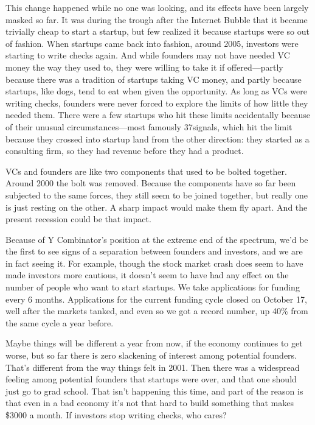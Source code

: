 This change happened while no one was looking, and its effects have been
largely masked so far. It was during the trough after the Internet
Bubble that it became trivially cheap to start a startup, but few
realized it because startups were so out of fashion. When startups came
back into fashion, around 2005, investors were starting to write checks
again. And while founders may not have needed VC money the way they used
to, they were willing to take it if offered---partly because there was a
tradition of startups taking VC money, and partly because startups, like
dogs, tend to eat when given the opportunity. As long as VCs were
writing checks, founders were never forced to explore the limits of how
little they needed them. There were a few startups who hit these limits
accidentally because of their unusual circumstances---most famously
37signals, which hit the limit because they crossed into startup land
from the other direction: they started as a consulting firm, so they had
revenue before they had a product.

VCs and founders are like two components that used to be bolted
together. Around 2000 the bolt was removed. Because the components have
so far been subjected to the same forces, they still seem to be joined
together, but really one is just resting on the other. A sharp impact
would make them fly apart. And the present recession could be that
impact.

Because of Y Combinator's position at the extreme end of the spectrum,
we'd be the first to see signs of a separation between founders and
investors, and we are in fact seeing it. For example, though the stock
market crash does seem to have made investors more cautious, it doesn't
seem to have had any effect on the number of people who want to start
startups. We take applications for funding every 6 months. Applications
for the current funding cycle closed on October 17, well after the
markets tanked, and even so we got a record number, up 40\% from the
same cycle a year before.

Maybe things will be different a year from now, if the economy continues
to get worse, but so far there is zero slackening of interest among
potential founders. That's different from the way things felt in 2001.
Then there was a widespread feeling among potential founders that
startups were over, and that one should just go to grad school. That
isn't happening this time, and part of the reason is that even in a bad
economy it's not that hard to build something that makes \$3000 a month.
If investors stop writing checks, who cares?

